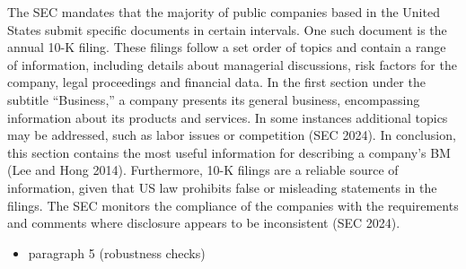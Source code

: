 \documentclass[
]{article}
\providecommand{\tightlist}{%
  \setlength{\itemsep}{0pt}\setlength{\parskip}{0pt}}\usepackage{longtable,booktabs,array}
\begin{document}
The SEC mandates that the majority of public companies based in the
United States submit specific documents in certain intervals. One such
document is the annual 10-K filing. These filings follow a set order of
topics and contain a range of information, including details about
managerial discussions, risk factors for the company, legal proceedings
and financial data. In the first section under the subtitle
``Business,'' a company presents its general business, encompassing
information about its products and services. In some instances
additional topics may be addressed, such as labor issues or competition
(SEC 2024). In conclusion, this section contains the most useful
information for describing a company's BM (Lee and Hong 2014).
Furthermore, 10-K filings are a reliable source of information, given
that US law prohibits false or misleading statements in the filings. The
SEC monitors the compliance of the companies with the requirements and
comments where disclosure appears to be inconsistent (SEC 2024).

\begin{itemize}
\tightlist
\item
  paragraph 5 (robustness checks)
\end{itemize}
\end{document}
